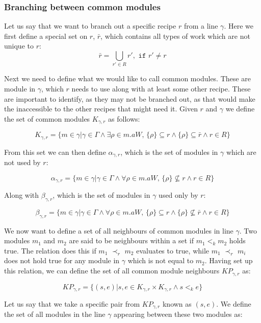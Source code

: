 \subsubsection{Branching between common modules}
Let us say that we want to branch out a specific recipe $r$ from a line $\gamma$. Here we first define a special set on $r$, $\bar{r}$, which contains all types of work which are not unique to $r$:
\[\bar{r} = \bigcup_{r' \in R}r', \texttt{ if } r' \neq r\]

Next we need to define what we would like to call common modules. These are module in $\gamma$, which $r$ needs to use along with at least some other recipe. These are important to identify, as they may not be branched out, as that would make the inaccessible to the other recipes that might need it.  Given $r$ and $\gamma$ we define the set of common modules $K_{\gamma ,r}$ as follows:

\[K_{\gamma ,r} = \{m \in \gamma | \gamma \in \Gamma \land \exists \rho \in m.aW,\, \{\rho\} \subseteq r \land \{\rho\} \subseteq \bar{r} \land r \in R\}\]

From this set we can then define $\alpha_{\gamma ,r}$, which is the set of modules in $\gamma$ which are not used by $r$: 

\[\alpha_{\gamma ,r}  = \{m \in \gamma | \gamma \in \Gamma \land \forall \rho \in m.aW,\, \{\rho\} \nsubseteq r \land r \in R\}\]

Along with $\beta_{\gamma ,r}$, which is the set of modules in $\gamma$ used only by $r$:

\[\beta_{\gamma ,r}  = \{m \in \gamma | \gamma \in \Gamma \land \forall \rho \in m.aW,\, \{\rho\} \subseteq r \land \{\rho\} \nsubseteq \bar{r} \land r \in R\}\]

We now want to define a set of all neighbours of common modules in line $\gamma$. Two modules $m_1$ and $m_2$ are said to be neighbours within a set if $m_1 <_k m_2$ holds true. The relation does this if $m_1$ $\prec_r$ $m_2$ evaluates to true, while $m_1$ $\prec_r$ $m_i$ does not hold true for any module in $\gamma$ which is not equal to $m_2$. Having set up this relation, we can define the set of all common module neighbours $KP_{\gamma ,r}$ as:
 
\[KP_{\gamma ,r} = \{(s, e)| {s, e} \in K_{\gamma ,r} \times K_{\gamma ,r} \land s <_k  e\}\]


Let us say that we take a specific pair from $KP_{\gamma ,r}$  known as $(s,e)$. We define the set of all modules in the line $\gamma$ appearing between these two modules as: 

